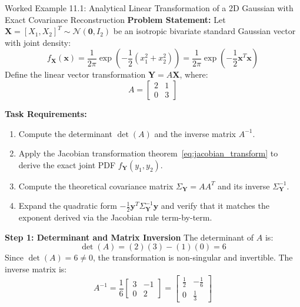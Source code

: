 \begin{examplebox}[breakable]{Worked Example 11.1: Analytical Linear Transformation of a 2D Gaussian with Exact Covariance Reconstruction}
\textbf{Problem Statement:}
Let $\mathbf{X} = [X_1, X_2]^T \sim \mathcal{N}(\mathbf{0}, I_2)$ be an isotropic bivariate standard Gaussian vector with joint density:
\begin{equation}
f_{\mathbf{X}}(\mathbf{x}) = \frac{1}{2\pi} \exp\left( -\frac{1}{2}(x_1^2 + x_2^2) \right) = \frac{1}{2\pi} \exp\left( -\frac{1}{2}\mathbf{x}^T \mathbf{x} \right)
\end{equation}
Define the linear vector transformation $\mathbf{Y} = A\mathbf{X}$, where:
\begin{equation}
A = \begin{bmatrix} 2 & 1 \\ 0 & 3 \end{bmatrix}
\end{equation}

\textbf{Task Requirements:}
\begin{enumerate}
    \item Compute the determinant $\det(A)$ and the inverse matrix $A^{-1}$.
    \item Apply the Jacobian transformation theorem~\eqref{eq:jacobian_transform} to derive the exact joint PDF $f_{\mathbf{Y}}(y_1, y_2)$.
    \item Compute the theoretical covariance matrix $\Sigma_{\mathbf{Y}} = A A^T$ and its inverse $\Sigma_{\mathbf{Y}}^{-1}$.
    \item Expand the quadratic form $-\frac{1}{2}\mathbf{y}^T \Sigma_{\mathbf{Y}}^{-1}\mathbf{y}$ and verify that it matches the exponent derived via the Jacobian rule term-by-term.
\end{enumerate}

\tcblower

\textbf{Step 1: Determinant and Matrix Inversion}
The determinant of $A$ is:
\begin{equation}
\det(A) = (2)(3) - (1)(0) = 6
\end{equation}
Since $\det(A) = 6 \ne 0$, the transformation is non-singular and invertible.
The inverse matrix is:
\begin{equation}
A^{-1} = \frac{1}{6} \begin{bmatrix} 3 & -1 \\ 0 & 2 \end{bmatrix} = \begin{bmatrix} \frac{1}{2} & -\frac{1}{6} \\ 0 & \frac{1}{3} \end{bmatrix}
\end{equation}


\end{examplebox}
